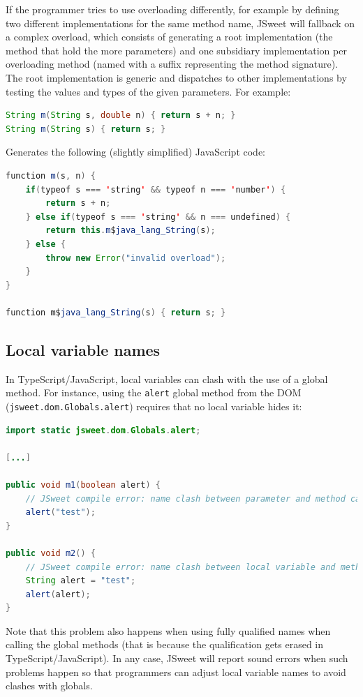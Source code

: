 \documentclass[a4paper]{report}
\begin{document}
If the programmer tries to use overloading differently, for example by defining two different implementations for the same method name, JSweet will fallback on a complex overload, which consists of generating a root implementation (the method that hold the more parameters) and one subsidiary implementation per overloading method (named with a suffix representing the method signature). The root implementation is generic and dispatches to other implementations by testing the values and types of the given parameters. For example:

\begin{lstlisting}[language=Java]
String m(String s, double n) { return s + n; }
String m(String s) { return s; }
\end{lstlisting}

Generates the following (slightly simplified) JavaScript code:

\begin{lstlisting}[language=Java]
function m(s, n) { 
	if(typeof s === 'string' && typeof n === 'number') { 	
		return s + n; 
	} else if(typeof s === 'string' && n === undefined) {
		return this.m$java_lang_String(s);
	} else {
		throw new Error("invalid overload");	
	}
}

function m$java_lang_String(s) { return s; }
\end{lstlisting}

\subsection{Local variable names}

In TypeScript/JavaScript, local variables can clash with the use of a global method. For instance, using the \texttt{alert} global method from the DOM (\texttt{jsweet.dom.Globals.alert}) requires that no local variable hides it:

\begin{lstlisting}[language=Java]
import static jsweet.dom.Globals.alert;

[...]

public void m1(boolean alert) {
	// JSweet compile error: name clash between parameter and method call
	alert("test");
}

public void m2() {
	// JSweet compile error: name clash between local variable and method call
	String alert = "test";
	alert(alert);
}
\end{lstlisting}

Note that this problem also happens when using fully qualified names when calling the global methods (that is because the qualification gets erased in TypeScript/JavaScript). In any case, JSweet will report sound errors when such problems happen so that programmers can adjust local variable names to avoid clashes with globals.
\end{document}
